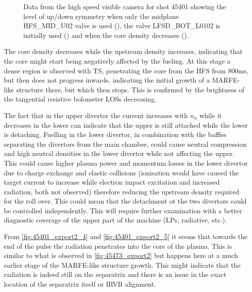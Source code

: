\begin{figure}[!ht]
\begin{subfigure}{0.054\linewidth}
    \end{subfigure}
    \caption{Data from the high speed visible camera for shot 45401 showing the level of up/down symmetry when only the midplane HFS\_MID\_U02 valve is used (), the valve LFSD\_BOT\_L0102 is initially used () and when the core density decreases ().}
    \label{fig:mu01_tomo3}
\end{figure}

The core density decreases while the upstream density increases, indicating that the core might start being negatively affected by the fueling. At this stage a dense region is observed with TS, penetrating the core from the HFS from 800ms, but then does not progress inwards, indicating the initial growth of a MARFE-like structure there, but which then stops. This is confirmed by the brightness of the tangential resistive bolometer LOSs decreasing.

The fact that in the upper divertor the current increases with $n_u$ while it decreases in the lower can indicate that the upper is still attached while the lower is detaching. Fuelling in the lower divertor, in combination with the baffles separating the divertors from the main chamber, could cause neutral compression and high neutral densities in the lower divertor while not affecting the upper. This could cause higher plasma power and momentum losses in the lower divertor due to charge exchange and elastic collisions (ionisation would have caused the target current to increase while electron impact excitation and increased radiation, both not observed) therefore reducing the upstream density required for the roll over. This could mean that the detachment ot the two divertors could be controlled independently. This will require further examination with a better diagnostic coverage of the upper part of the machine (LPs, radiative, etc.).

From \autoref{fig:45401_export2_4} and \ref{fig:45401_export2_5} it seems that towards the end of the pulse the radiation penetrates into the core of the plasma. This is similar to what is observed in \autoref{fig:45473_export2} but happens here at a much earlier stage of the MARFE-like structure growth. This might indicate that the radiation is indeed still on the separatrix and there is an issue in the exact location of the separatrix itself or IRVB alignment.

